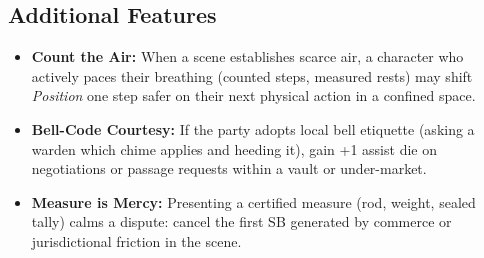 \subsection*{Additional Features}
\begin{itemize}
\item \textbf{Count the Air:} When a scene establishes scarce air, a character who actively paces their breathing (counted steps, measured rests) may shift \emph{Position} one step safer on their next physical action in a confined space.
\item \textbf{Bell-Code Courtesy:} If the party adopts local bell etiquette (asking a warden which chime applies and heeding it), gain +1 assist die on negotiations or passage requests within a vault or under-market.
\item \textbf{Measure is Mercy:} Presenting a certified measure (rod, weight, sealed tally) calms a dispute: cancel the first SB generated by commerce or jurisdictional friction in the scene.
\end{itemize}

